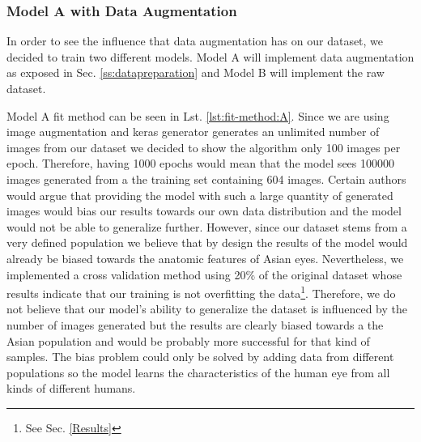 \documentclass[12pt,a4paper]{scrartcl}
\begin{document}
\subsubsection{Model A with Data Augmentation}
In order to see the influence that data augmentation has on our dataset, we decided to train two different models. Model A will implement data augmentation as exposed in Sec. \ref{ss:datapreparation} and Model B will implement the raw dataset.

Model A fit method can be seen in Lst. \ref{lst:fit-method:A}. Since we are using image augmentation and keras generator generates an unlimited number of images from our dataset we decided to show the algorithm only 100 images per epoch. Therefore, having 1000 epochs would mean that the model sees 100000 images generated from a the training set containing 604 images. Certain authors \cite{Shorten2019, mikolajcyk2018} would argue that providing the model with such a large quantity of generated images would bias our results towards our own data distribution and the model would not be able to generalize further. However, since our dataset stems from a very defined population we believe that by design the results of the model would already be biased towards the anatomic features of Asian eyes. Nevertheless, we implemented a cross validation method using 20\% of the original dataset whose results indicate that our training is not overfitting the data\footnote{See Sec. \ref{Results}}. Therefore, we do not believe that our model's ability to generalize the dataset is influenced by the number of images generated but the results are clearly biased towards a the Asian population and would be probably more successful for that kind of samples. The bias problem could only be solved by adding data from different populations so the model learns the characteristics of the human eye from all kinds of different humans. 
\end{document}
